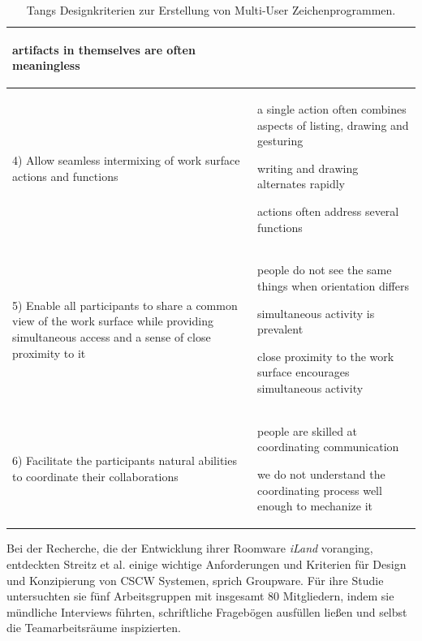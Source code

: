 \begin{table}
\begin{tabularx}{\textwidth}{p{5cm}X}
{\begin{compactitem}
		\item artifacts in themselves are often meaningless 
	\end{compactitem} }
	\\ [-12pt] \hline
	\small{
	4) 
	Allow seamless intermixing of work surface actions and functions} & \small{ 
	\begin{compactitem}
		\item a single action often combines aspects of listing, drawing and gesturing %
		\item writing and drawing alternates rapidly %
		\item actions often address several functions 
	\end{compactitem} }
	\\ [-12pt] \hline
	\small{
	5) 
	Enable all participants to share a common view of the work surface while providing simultaneous access and a sense of close proximity to it} & \small{ 
	\begin{compactitem}
		\item people do not see the same things when orientation differs %
		\item simultaneous activity is prevalent %
		\item close proximity to the work surface encourages simultaneous activity 
	\end{compactitem} }
	\\ [-12pt] \hline
	\small{
	6) 
	Facilitate the participants natural abilities to coordinate their collaborations} & \small{ 
	\begin{compactitem}
		\item people are skilled at coordinating communication %
		\item we do not understand the coordinating process well enough to mechanize it 
	\end{compactitem} }
	\\ [-12pt] \bottomrule
\end{tabularx}
  \caption[Tangs Designkriterien \newline \citep{TangJC:1989}]{Tangs Designkriterien zur Erstellung von Multi-User Zeichenprogrammen.}
  \label{tab:tangDesignKriterien}
\end{table}

\bigskip Bei der Recherche, die der Entwicklung ihrer Roomware \emph{iLand} \citep{Streitz:1998p198} voranging, entdeckten Streitz et al. einige wichtige Anforderungen und Kriterien für Design und Konzipierung von CSCW Systemen, sprich Groupware. Für ihre Studie untersuchten sie fünf Arbeitsgruppen mit insgesamt 80 Mitgliedern, indem sie mündliche Interviews führten, schriftliche Fragebögen ausfüllen ließen und selbst die Teamarbeitsräume inspizierten.

